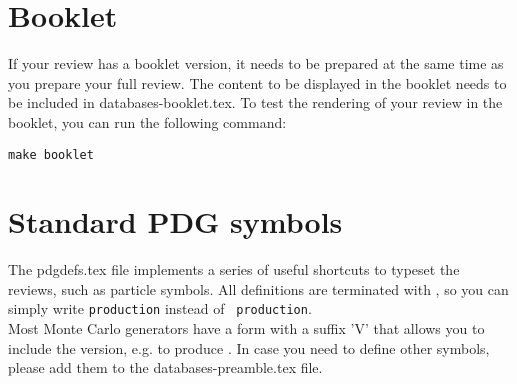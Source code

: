 \section{Booklet}

If your review has a booklet version, it needs to be prepared at the same time as you prepare your full review.
The content to be displayed in the booklet needs to be included in databases-booklet.tex. 
To test the rendering of your review in the booklet, you can run the following command:
\begin{verbatim}
make booklet
\end{verbatim}





\section{Standard PDG symbols}

The pdgdefs.tex file implements a series of useful shortcuts to typeset the reviews, such as particle symbols. 
All definitions are terminated with  \texttt{\string\xspace} , so you can simply write  \texttt{\string\ttbar} \texttt{production} instead of  \texttt{\string\ttbar \string\ production}.\\
Most Monte Carlo generators have a form with a suffix 'V' that allows you to include the version, e.g. \texttt{\string{}} to produce \texttt{}.
In case you need to define other symbols, please add them to the databases-preamble.tex file.


